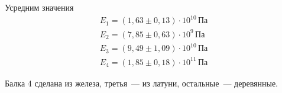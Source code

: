 Усредним значения
\begin{gather*}
    E_{1} = \left(1{,}63\pm 0{,}13\right)\cdot 10^{10}\,\text{Па} \\
    E_{2} = \left(7{,}85\pm 0{,}63\right)\cdot 10^{9}\,\text{Па} \\
    E_{3} = \left(9{,}49\pm 1{,}09\right)\cdot 10^{10}\,\text{Па} \\
    E_{4} = \left(1{,}85\pm 0{,}18\right)\cdot 10^{11}\,\text{Па}
\end{gather*}

Балка 4 сделана из железа, третья~--- из латуни, остальные~--- деревянные.
